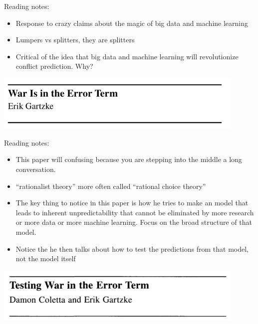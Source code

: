 \documentclass[aspectratio=169]{beamer}
\begin{document}
\begin{frame}
\frametitle{}

Reading notes:
\begin{itemize}
\item Response to crazy claims about the magic of big data and machine learning
\pause
\item Lumpers vs splitters, they are splitters
\pause
\item Critical of the idea that big data and machine learning will revolutionize conflict prediction.  Why?
\end{itemize}

\end{frame}
\begin{frame}

\begin{center}
\includegraphics[width=0.9\textwidth]{figures/gartzke_war_1999_title}
\end{center}

\end{frame}
\begin{frame}

Reading notes:
\begin{itemize}
\item This paper will confusing because you are stepping into the middle a long conversation.
\pause
\item ``rationalist theory'' more often called ``rational choice theory''
\pause
\item The key thing to notice in this paper is how he tries to make an model that leads to inherent unpredictability that cannot be eliminated by more research or more data or more machine learning.   Focus on the broad structure of that model.
\pause
\item Notice the he then talks about how to test the predictions from that model, not the model itself
\end{itemize}

\end{frame}
\begin{frame}

\begin{center}
\includegraphics[width=0.9\textwidth]{figures/coletta_testing_2003_title}
\end{center}

\end{frame}
\end{document}

